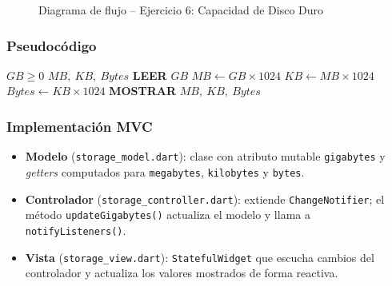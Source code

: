 \documentclass[12pt,a4paper]{article}
\begin{document}
\begin{figure}[H]
\centering
{}
\caption{Diagrama de flujo -- Ejercicio 6: Capacidad de Disco Duro}
\label{fig:flujo_e6}
\end{figure}

\subsubsection{Pseudocódigo}

\begin{algorithm}[H]
\caption{Conversión de Capacidad de Almacenamiento}
\label{alg:storage}
\begin{algorithmic}[1]
  \Require $GB \geq 0$
  \Ensure $MB,\ KB,\ Bytes$
  \State \textbf{LEER} $GB$
  \State $MB \leftarrow GB \times 1024$
  \State $KB \leftarrow MB \times 1024$
  \State $Bytes \leftarrow KB \times 1024$
  \State \textbf{MOSTRAR} $MB,\ KB,\ Bytes$
\end{algorithmic}
\end{algorithm}

\subsubsection{Implementación MVC}

\begin{itemize}
  \item \textbf{Modelo} (\texttt{storage\_model.dart}): clase con atributo mutable \texttt{gigabytes} y \textit{getters} computados para \texttt{megabytes}, \texttt{kilobytes} y \texttt{bytes}.
  \item \textbf{Controlador} (\texttt{storage\_controller.dart}): extiende \texttt{ChangeNotifier}; el método \texttt{updateGigabytes()} actualiza el modelo y llama a \texttt{notifyListeners()}.
  \item \textbf{Vista} (\texttt{storage\_view.dart}): \texttt{StatefulWidget} que escucha cambios del controlador y actualiza los valores mostrados de forma reactiva.
\end{itemize}
\end{document}
